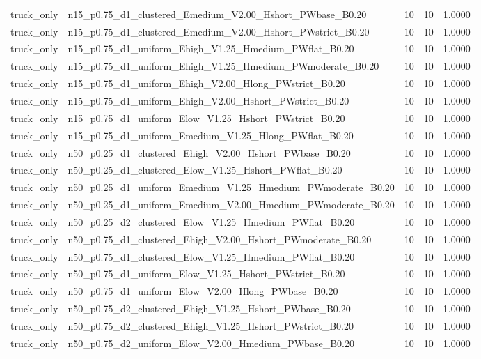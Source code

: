 \begin{tabular}{llrrr}
truck_only & n15_p0.75_d1_clustered_Emedium_V2.00_Hshort_PWbase_B0.20 & 10 & 10 & 1.0000 \\
truck_only & n15_p0.75_d1_clustered_Emedium_V2.00_Hshort_PWstrict_B0.20 & 10 & 10 & 1.0000 \\
truck_only & n15_p0.75_d1_uniform_Ehigh_V1.25_Hmedium_PWflat_B0.20 & 10 & 10 & 1.0000 \\
truck_only & n15_p0.75_d1_uniform_Ehigh_V1.25_Hmedium_PWmoderate_B0.20 & 10 & 10 & 1.0000 \\
truck_only & n15_p0.75_d1_uniform_Ehigh_V2.00_Hlong_PWstrict_B0.20 & 10 & 10 & 1.0000 \\
truck_only & n15_p0.75_d1_uniform_Ehigh_V2.00_Hshort_PWstrict_B0.20 & 10 & 10 & 1.0000 \\
truck_only & n15_p0.75_d1_uniform_Elow_V1.25_Hshort_PWstrict_B0.20 & 10 & 10 & 1.0000 \\
truck_only & n15_p0.75_d1_uniform_Emedium_V1.25_Hlong_PWflat_B0.20 & 10 & 10 & 1.0000 \\
truck_only & n50_p0.25_d1_clustered_Ehigh_V2.00_Hshort_PWbase_B0.20 & 10 & 10 & 1.0000 \\
truck_only & n50_p0.25_d1_clustered_Elow_V1.25_Hshort_PWflat_B0.20 & 10 & 10 & 1.0000 \\
truck_only & n50_p0.25_d1_uniform_Emedium_V1.25_Hmedium_PWmoderate_B0.20 & 10 & 10 & 1.0000 \\
truck_only & n50_p0.25_d1_uniform_Emedium_V2.00_Hmedium_PWmoderate_B0.20 & 10 & 10 & 1.0000 \\
truck_only & n50_p0.25_d2_clustered_Elow_V1.25_Hmedium_PWflat_B0.20 & 10 & 10 & 1.0000 \\
truck_only & n50_p0.75_d1_clustered_Ehigh_V2.00_Hshort_PWmoderate_B0.20 & 10 & 10 & 1.0000 \\
truck_only & n50_p0.75_d1_clustered_Elow_V1.25_Hmedium_PWflat_B0.20 & 10 & 10 & 1.0000 \\
truck_only & n50_p0.75_d1_uniform_Elow_V1.25_Hshort_PWstrict_B0.20 & 10 & 10 & 1.0000 \\
truck_only & n50_p0.75_d1_uniform_Elow_V2.00_Hlong_PWbase_B0.20 & 10 & 10 & 1.0000 \\
truck_only & n50_p0.75_d2_clustered_Ehigh_V1.25_Hshort_PWbase_B0.20 & 10 & 10 & 1.0000 \\
truck_only & n50_p0.75_d2_clustered_Ehigh_V1.25_Hshort_PWstrict_B0.20 & 10 & 10 & 1.0000 \\
truck_only & n50_p0.75_d2_uniform_Elow_V2.00_Hmedium_PWbase_B0.20 & 10 & 10 & 1.0000 \\
\bottomrule
\end{tabular}
